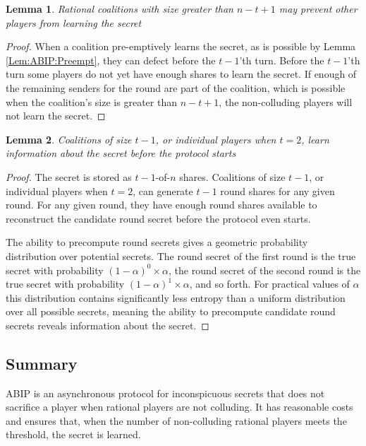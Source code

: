 \documentclass{dalcsthesis}
\newtheorem{lemma}{Lemma}
\begin{document}
\begin{lemma} Rational coalitions with size greater than $n-t+1$ may prevent other players from learning the secret \label{Lem:ABIP:RatColsCanPrevents} \end{lemma}
\begin{proof}
When a coalition pre-emptively learns the secret, as is possible by Lemma \ref{Lem:ABIP:Preempt}, they can defect before the $t-1$'th turn. Before the $t-1$'th turn some players do not yet have enough shares to learn the secret. If enough of the remaining senders for the round are part of the coalition, which is possible when the coalition's size is greater than $n-t+1$, the non-colluding players will not learn the secret.
\end{proof}

\begin{lemma} Coalitions of size $t-1$, or individual players when $t=2$, learn information about the secret before the protocol starts \end{lemma}
\begin{proof}
The secret is stored as $t-1$-of-$n$ shares. Coalitions of size $t-1$, or individual players when $t=2$, can generate $t-1$ round shares for any given round. For any given round, they have enough round shares available to reconstruct the candidate round secret before the protocol even starts.

The ability to precompute round secrets gives a geometric probability distribution over potential secrets. The round secret of the first round is the true secret with probability $(1-\alpha)^0 \times \alpha$, the round secret of the second round is the true secret with probability $(1-\alpha)^1 \times \alpha$, and so forth. For practical values of $\alpha$ this distribution contains significantly less entropy than a uniform distribution over all possible secrets, meaning the ability to precompute candidate round secrets reveals information about the secret.
\end{proof}

\subsection{Summary}

ABIP is an asynchronous protocol for inconspicuous secrets that does not sacrifice a player when rational players are not colluding. It has reasonable costs and ensures that, when the number of non-colluding rational players meets the threshold, the secret is learned.
\end{document}
